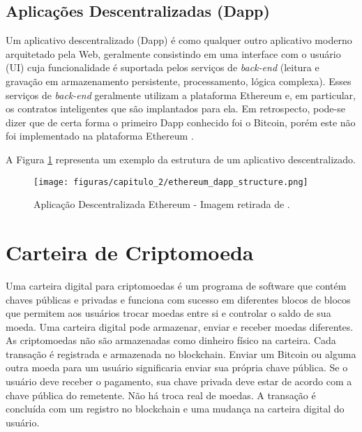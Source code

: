 \subsection{Aplicações Descentralizadas (Dapp)}

Um aplicativo descentralizado (Dapp) é como qualquer outro aplicativo moderno arquitetado pela Web, geralmente consistindo em uma interface com o usuário (UI) cuja funcionalidade é suportada pelos serviços de \textit{back-end} (leitura e gravação em armazenamento persistente, processamento, lógica complexa). Esses serviços de \textit{back-end} geralmente utilizam a plataforma Ethereum e, em particular, os contratos inteligentes que são implantados para ela. Em retrospecto, pode-se dizer que de certa forma o primeiro Dapp conhecido foi o Bitcoin, porém este não foi implementado na plataforma Ethereum \cite{blockchain_pratical_guide}.

A Figura \ref{fig:dapp_ethereum} representa um exemplo da estrutura de um aplicativo descentralizado.

    \begin{figure}[h]
         \centering
         \texttt{[image: figuras/capitulo\_2/ethereum\_dapp\_structure.png]}
         \caption{Aplicação Descentralizada Ethereum - Imagem retirada de \cite{blockchain_pratical_guide}.}
         \label{fig:dapp_ethereum}
    \end{figure}
    
\section{Carteira de Criptomoeda}
\label{carteira_criptomoeda}

Uma carteira digital para criptomoedas é um programa de software que contém chaves públicas e privadas e funciona com sucesso em diferentes blocos de blocos que permitem aos usuários trocar moedas entre si e controlar o saldo de sua moeda. Uma carteira digital pode armazenar, enviar e receber moedas diferentes. As criptomoedas não são armazenadas como dinheiro físico na carteira. Cada transação é registrada e armazenada no blockchain. Enviar um Bitcoin ou alguma outra moeda para um usuário significaria enviar sua própria chave pública. Se o usuário deve receber o pagamento, sua chave privada deve estar de acordo com a chave pública do remetente. Não há troca real de moedas. A transação é concluída com um registro no blockchain e uma mudança na carteira digital do usuário. \cite{wallet_guide}


